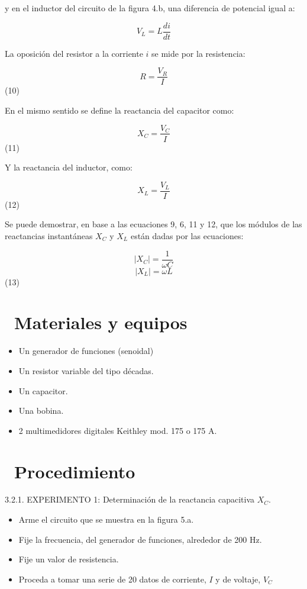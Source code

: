 \documentclass[11pt,a4paper]{article}
\newcommand{\iconotexto}[2]{\textcolor{cyanNeon}{\faIcon{#1}}~#2}
\begin{document}
y en el inductor del circuito de la figura 4.b, una diferencia de potencial igual a:

\[V_L = L \frac{di}{dt}\]

La oposición del resistor a la corriente $i$ se mide por la resistencia:

\[R = \frac{V_R}{I}\] (10)

En el mismo sentido se define la reactancia del capacitor como:

\[X_C = \frac{V_C}{I}\] (11)

Y la reactancia del inductor, como:

\[X_L = \frac{V_L}{I}\] (12)

Se puede demostrar, en base a las ecuaciones 9, 6, 11 y 12, que los módulos de las reactancias instantáneas $X_C$ y $X_L$ están dadas por las ecuaciones:

\[|X_C| = \frac{1}{\omega C}\] \[|X_L| = \omega L\] (13)

\section{\iconotexto{box-open}{Materiales y equipos}}

\begin{itemize}[leftmargin=1.4em,itemsep=2pt,topsep=3pt]
  \item Un generador de funciones (senoidal)
  \item Un resistor variable del tipo décadas.
  \item Un capacitor.
  \item Una bobina.
  \item 2 multimedidores digitales Keithley mod. 175 o 175 A.
\end{itemize}

\section{\iconotexto{list-ol}{Procedimiento}}

3.2.1. EXPERIMENTO 1: Determinación de la reactancia capacitiva $X_C$.

\begin{itemize}[leftmargin=1.4em,itemsep=2pt,topsep=3pt]
  \item Arme el circuito que se muestra en la figura 5.a.
  \item Fije la frecuencia, del generador de funciones, alrededor de 200 Hz.
  \item Fije un valor de resistencia.
  \item Proceda a tomar una serie de 20 datos de corriente, $I$ y de voltaje, $V_C$
\end{itemize}
\end{document}
